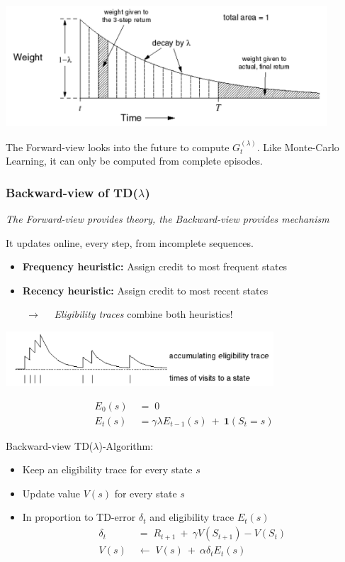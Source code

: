 \documentclass[10pt]{article}
\begin{document}
\includegraphics[width=0.9\textwidth]{pictures/tdl_weight.jpg}

The Forward-view looks into the future to compute $G_{t}^{(\lambda)}$. Like Monte-Carlo Learning, it can only be computed from complete episodes.
\newpage
\subsubsection*{Backward-view of TD($\lambda$)}

\begin{center}

\textit{The Forward-view provides theory, the Backward-view provides mechanism}
\end{center}
It updates online, every step, from incomplete sequences. \newline

\begin{itemize}
\item \textbf{Frequency heuristic:} Assign credit to most frequent states
\item \textbf{Recency heuristic:} Assign credit to most recent states
\end{itemize}
$\qquad \rightarrow \quad$ \textit{Eligibility traces} combine both heuristics!

\includegraphics[width=0.75\textwidth]{pictures/eli_trace.jpg}

\begin{align*}
E_{0}(s) \; &= \; 0 \\
E_{t}(s) \; &= \gamma \lambda E_{t-1}(s)\: + \: \mathbf{1}(S_{t} =s)
\end{align*}

Backward-view TD($\lambda$)-Algorithm:
\begin{itemize}
\item Keep an eligibility trace for every state $s$
\item Update value $V(s)$ for every state $s$
\item In proportion to TD-error $\delta_{t}$ and eligibility trace $E_{t}(s)$
\begin{align}
\delta_{t} \; &= \; R_{t+1} \: + \: \gamma V(S_{t+1}) - V(S_{t}) \\
V(s) \; &\leftarrow \; V(s) \: + \: \alpha \delta_{t} E_{t}(s)
\end{align}
\end{itemize}
\end{document}
